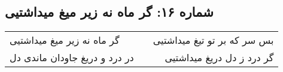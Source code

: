 \begin{center}
\section*{شماره ۱۶: گر ماه نه زیر میغ میداشتیی}
\label{sec:016}
\begin{longtable}{l p{0.5cm} r}
گر ماه نه زیر میغ میداشتیی
&&
بس سر که بر تو تیغ میداشتیی
\\
در درد و دریغ جاودان ماندی دل
&&
گر درد ز دل دریغ میداشتیی
\\
\end{longtable}
\end{center}
